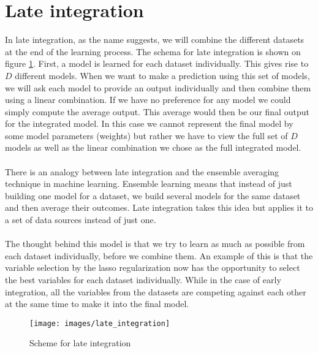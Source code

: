 \section{Late integration}
\label{sec:integration-late}
In late integration, as the name suggests, we will combine the different datasets at the end of the learning process. The schema for late integration is shown on figure \ref{fig:integration-late}. First, a model is learned for each dataset individually. This gives rise to $D$ different models. When we want to make a prediction using this set of models, we will ask each model to provide an output individually and then combine them using a linear combination. If we have no preference for any model we could simply compute the average output. This average would then be our final output for the integrated model. In this case we cannot represent the final model by some model parameters (weights) but rather we have to view the full set of $D$ models as well as the linear combination we chose as the full integrated model. \\ \\
There is an analogy between late integration and the ensemble averaging technique in machine learning. Ensemble learning means that instead of just building one model for a dataset, we build several models for the same dataset and then average their outcomes. Late integration takes this idea but applies it to a set of data sources instead of just one. \\ \\
The thought behind this model is that we try to learn as much as possible from each dataset individually, before we combine them. An example of this is that the variable selection by the lasso regularization now has the opportunity to select the best variables for each dataset individually. While in the case of early integration, all the variables from the datasets are competing against each other at the same time to make it into the final model.
\begin{figure}
	\centering
	\texttt{[image: images/late\_integration]}
	\caption{Scheme for late integration}
	\label{fig:integration-late}
\end{figure}

